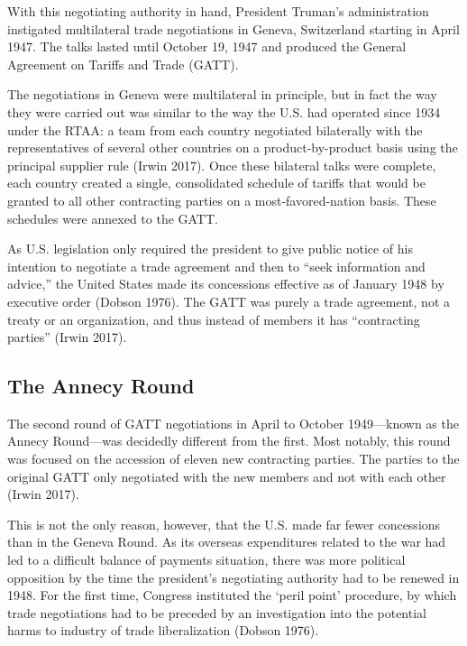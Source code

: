 \documentclass[
  12pt,
]{article}
\begin{document}
With this negotiating authority in hand, President Truman's administration instigated multilateral trade negotiations in Geneva, Switzerland starting in April 1947. The talks lasted until October 19, 1947 and produced the General Agreement on Tariffs and Trade (GATT).

The negotiations in Geneva were multilateral in principle, but in fact the way they were carried out was similar to the way the U.S. had operated since 1934 under the RTAA: a team from each country negotiated bilaterally with the representatives of several other countries on a product-by-product basis using the principal supplier rule (Irwin 2017). Once these bilateral talks were complete, each country created a single, consolidated schedule of tariffs that would be granted to all other contracting parties on a most-favored-nation basis. These schedules were annexed to the GATT.

As U.S. legislation only required the president to give public notice of his intention to negotiate a trade agreement and then to ``seek information and advice,'' the United States made its concessions effective as of January 1948 by executive order (Dobson 1976). The GATT was purely a trade agreement, not a treaty or an organization, and thus instead of members it has ``contracting parties'' (Irwin 2017).

\hypertarget{the-annecy-round}{%
\subsection{The Annecy Round}\label{the-annecy-round}}

The second round of GATT negotiations in April to October 1949---known as the Annecy Round---was decidedly different from the first. Most notably, this round was focused on the accession of eleven new contracting parties. The parties to the original GATT only negotiated with the new members and not with each other (Irwin 2017).

This is not the only reason, however, that the U.S. made far fewer concessions than in the Geneva Round. As its overseas expenditures related to the war had led to a difficult balance of payments situation, there was more political opposition by the time the president's negotiating authority had to be renewed in 1948. For the first time, Congress instituted the `peril point' procedure, by which trade negotiations had to be preceded by an investigation into the potential harms to industry of trade liberalization (Dobson 1976).
\end{document}
